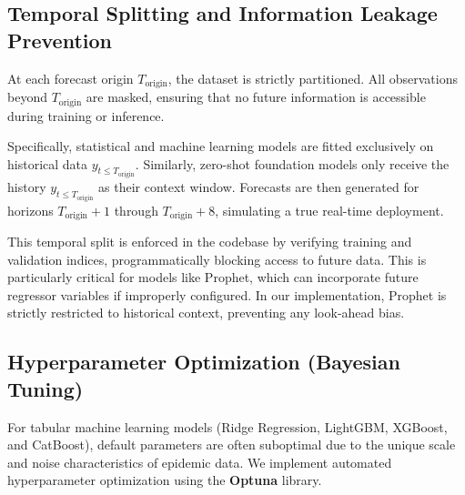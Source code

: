 \subsection{Temporal Splitting and Information Leakage Prevention}
At each forecast origin $T_{\text{origin}}$, the dataset is strictly partitioned. All observations beyond $T_{\text{origin}}$ are masked, ensuring that no future information is accessible during training or inference.

Specifically, statistical and machine learning models are fitted exclusively on historical data $y_{t \le T_{\text{origin}}}$. Similarly, zero-shot foundation models only receive the history $y_{t \le T_{\text{origin}}}$ as their context window. Forecasts are then generated for horizons $T_{\text{origin}} + 1$ through $T_{\text{origin}} + 8$, simulating a true real-time deployment.

This temporal split is enforced in the codebase by verifying training and validation indices, programmatically blocking access to future data. This is particularly critical for models like Prophet, which can incorporate future regressor variables if improperly configured. In our implementation, Prophet is strictly restricted to historical context, preventing any look-ahead bias.

\subsection{Hyperparameter Optimization (Bayesian Tuning)}
For tabular machine learning models (Ridge Regression, LightGBM, XGBoost, and CatBoost), default parameters are often suboptimal due to the unique scale and noise characteristics of epidemic data. We implement automated hyperparameter optimization using the \textbf{Optuna} library.

